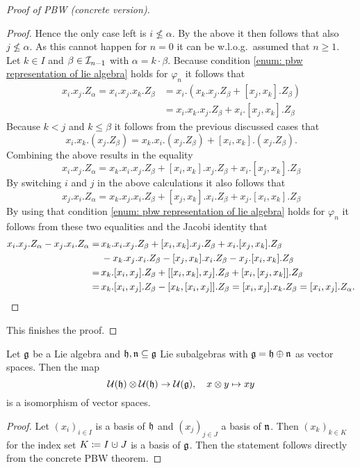 \begin{proof}[Proof of PBW (concrete version)]
\begin{proof}
  Hence the only case left is $i \nleq \alpha$. By the above it then follows that also $j \nleq \alpha$. As this cannot happen for $n = 0$ it can be w.l.o.g.\ assumed that $n \geq 1$. Let $k \in I$ and $\beta \in \mathcal{I}_{n-1}$ with $\alpha = k \cdot \beta$. Because condition \ref{enum: pbw representation of lie algebra} holds for $\varphi_n$ it follows that
  \begin{align*}
   x_i.x_j.Z_\alpha
   = x_i.x_j.x_k.Z_\beta
   &= x_i.(x_k.x_j.Z_\beta + [x_j, x_k].Z_\beta) \\
   &= x_i.x_k.x_j.Z_\beta + x_i.[x_j, x_k].Z_\beta
  \end{align*}
  Because $k < j$ and $k \leq \beta$ it follows from the previous discussed cases that
  \[
   x_i.x_k.(x_j.Z_\beta)
   = x_k.x_i.(x_j.Z_\beta) + [x_i, x_k].(x_j.Z_\beta).
  \]
  Combining the above results in the equality
  \[
   x_i.x_j.Z_\alpha
   = x_k.x_i.x_j.Z_\beta + [x_i, x_k].x_j.Z_\beta + x_i.[x_j, x_k].Z_\beta
  \]
  By switching $i$ and $j$ in the above calculations it also follows that 
  \[
   x_j.x_i.Z_\alpha
   = x_k.x_j.x_i.Z_\beta + [x_j, x_k].x_i.Z_\beta + x_j.[x_i, x_k].Z_\beta
  \]
  By using that condition \ref{enum: pbw representation of lie algebra} holds for $\varphi_n$ it follows from these two equalities and the Jacobi identity that
  \begin{align*}
        x_i.x_j.Z_\alpha - x_j.x_i.Z_\alpha 
   =&\, x_k.x_i.x_j.Z_\beta + [x_i, x_k].x_j.Z_\beta + x_i.[x_j, x_k].Z_\beta \\
    &\, - x_k.x_j.x_i.Z_\beta - [x_j, x_k].x_i.Z_\beta - x_j.[x_i, x_k].Z_\beta \\
   =&\, x_k.[x_i, x_j].Z_\beta + [[x_i, x_k], x_j].Z_\beta +  [x_i,[x_j,x_k]].Z_\beta \\
   =&\, x_k.[x_i, x_j].Z_\beta - [x_k, [x_i, x_j]].Z_\beta
   =    [x_i, x_j].x_k.Z_\beta
   =    [x_i, x_j].Z_\alpha.
  \qedhere
  \end{align*}
 \end{proof}
 This finishes the proof. 
\end{proof}


\begin{cor}
 Let $\mathfrak{g}$ be a Lie algebra and $\mathfrak{h}, \mathfrak{n} \subseteq \mathfrak{g}$ Lie subalgebras with $\mathfrak{g} = \mathfrak{h} \oplus \mathfrak{n}$ as vector spaces. Then the map
 \[
  \mathcal{U}(\mathfrak{h}) \otimes \mathcal{U}(\mathfrak{h}) \to \mathcal{U}(\mathfrak{g}), \quad x \otimes y \mapsto xy
 \]
 is a isomorphism of vector spaces.
\end{cor}
\begin{proof}
 Let $(x_i)_{i \in I}$ is a basis of $\mathfrak{h}$ and $(x_j)_{j \in J}$ a basis of $\mathfrak{n}$. Then $(x_k)_{k \in K}$ for the index set $K \coloneqq I \dotcup J$ is a basis of $\mathfrak{g}$. Then the statement follows directly from the concrete PBW theorem.
\end{proof}



